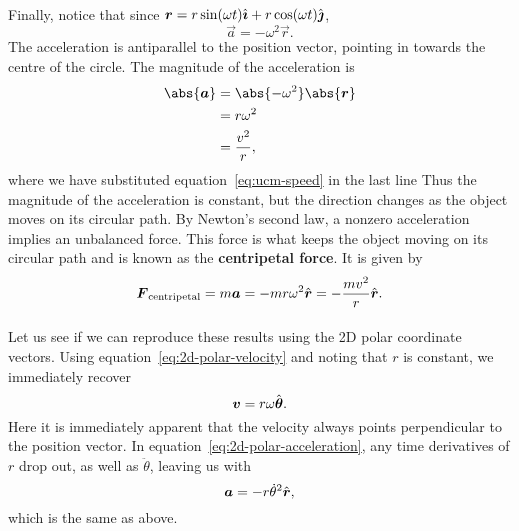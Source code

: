 \documentclass[../classical_mechanics.tex]{subfiles}
\begin{document}
        \paragraph{}
        Finally, notice that since $\boldsymbol{r}=r\sin(\omega t)\hat{\boldsymbol{\imath}}+r\cos(\omega t)\hat{\boldsymbol{\jmath}}$,
        \begin{equation}
            \vec{a}=-\omega^2\vec{r}.
        \end{equation}
        The acceleration is antiparallel to the position vector, pointing in towards the centre of the circle.
        The magnitude of the acceleration is
        \begin{align}
            \abs{\vec{a}}&=\abs{-\omega^2}\abs{\vec{r}}\\
            &=r\omega^2\\
            &=\frac{v^2}{r},
        \end{align}
        where we have substituted equation~\ref{eq:ucm-speed} in the last line
        Thus the magnitude of the acceleration is constant, but the direction changes as the object moves on its circular path.
        By Newton's second law, a nonzero acceleration implies an unbalanced force.
        This force is what keeps the object moving on its circular path and is known as the \textbf{centripetal force}.
        It is given by
        \begin{equation}
            \boldsymbol{F}_\text{centripetal}=m\boldsymbol{a}=-mr\omega^2\hat{\boldsymbol{r}}=-\frac{mv^2}{r}\hat{\boldsymbol{r}}.
        \end{equation}

        \paragraph{}
        Let us see if we can reproduce these results using the 2D polar coordinate vectors.
        Using equation~\ref{eq:2d-polar-velocity} and noting that $r$ is constant, we immediately recover
        \begin{equation}
            \boldsymbol{v}=r\omega\hat{\boldsymbol{\theta}}.
        \end{equation}
        Here it is immediately apparent that the velocity always points perpendicular to the position vector.
        In equation~\ref{eq:2d-polar-acceleration}, any time derivatives of $r$ drop out, as well as $\ddot{\theta}$, leaving us with
        \begin{equation}
            \boldsymbol{a}=-r\dot{\theta}^2\hat{\boldsymbol{r}},
        \end{equation}
        which is the same as above.       
        
\end{document}

